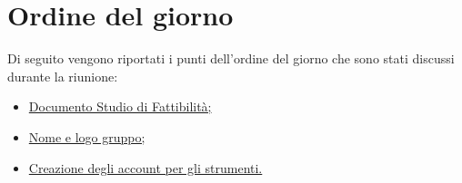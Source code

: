 \clearpage
\section{Ordine del giorno}
Di seguito vengono riportati i punti dell’ordine del giorno che sono stati discussi durante la riunione:
\begin{itemize}
	\item \hyperref[sec:documento_studio_fattibilità]{Documento Studio di Fattibilità;}
	\item \hyperref[sec:nome_logo]{Nome e logo gruppo;}
	\item \hyperref[sec:account_studenti]{Creazione degli account per gli strumenti.}
\end{itemize}